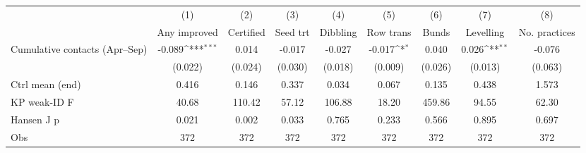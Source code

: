 {
\def\sym#1{\ifmmode^{#1}\else\(^{#1}\)\fi}
\begin{tabular}{l*{8}{c}}
\toprule
                    &\multicolumn{1}{c}{(1)}&\multicolumn{1}{c}{(2)}&\multicolumn{1}{c}{(3)}&\multicolumn{1}{c}{(4)}&\multicolumn{1}{c}{(5)}&\multicolumn{1}{c}{(6)}&\multicolumn{1}{c}{(7)}&\multicolumn{1}{c}{(8)}\\
                    &\multicolumn{1}{c}{Any improved}&\multicolumn{1}{c}{Certified}&\multicolumn{1}{c}{Seed trt}&\multicolumn{1}{c}{Dibbling}&\multicolumn{1}{c}{Row trans}&\multicolumn{1}{c}{Bunds}&\multicolumn{1}{c}{Levelling}&\multicolumn{1}{c}{No. practices}\\
\midrule
Cumulative contacts (Apr--Sep)&      -0.089\sym{***}&       0.014         &      -0.017         &      -0.027         &      -0.017\sym{*}  &       0.040         &       0.026\sym{**} &      -0.076         \\
                    &     (0.022)         &     (0.024)         &     (0.030)         &     (0.018)         &     (0.009)         &     (0.026)         &     (0.013)         &     (0.063)         \\
\midrule
Ctrl mean (end)     &       0.416         &       0.146         &       0.337         &       0.034         &       0.067         &       0.135         &       0.438         &       1.573         \\
KP weak-ID F        &       40.68         &      110.42         &       57.12         &      106.88         &       18.20         &      459.86         &       94.55         &       62.30         \\
Hansen J p          &       0.021         &       0.002         &       0.033         &       0.765         &       0.233         &       0.566         &       0.895         &       0.697         \\
Obs                 &         372         &         372         &         372         &         372         &         372         &         372         &         372         &         372         \\
\bottomrule
\end{tabular}
}

